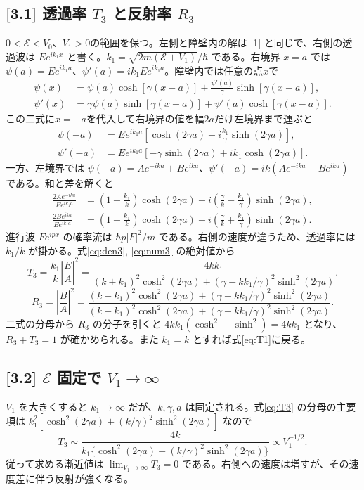 \documentclass[11pt,a4paper]{article}
\begin{document}
\subsection*{[3.1] 透過率 $T_3$ と反射率 $R_3$}
$0<\mathcal E<V_0$、$V_1>0$の範囲を保つ。左側と障壁内の解は [1] と同じで、右側の透過波は $Ee^{ik_1x}$ と書く。$k_1=\sqrt{2m(\mathcal E+V_1)}/\hbar$ である。右境界 $x=a$ では $\psi(a)=Ee^{ik_1a}$、$\psi'(a)=ik_1Ee^{ik_1a}$。障壁内では任意の点$x$で
\begin{align*}
 \psi(x)&=\psi(a)\cosh[\gamma(x-a)]+\frac{\psi'(a)}\gamma\sinh[\gamma(x-a)],\\
 \psi'(x)&=\gamma\psi(a)\sinh[\gamma(x-a)]+\psi'(a)\cosh[\gamma(x-a)].
\end{align*}
この二式に$x=-a$を代入して右境界の値を幅$2a$だけ左境界まで運ぶと
\begin{align*}
 \psi(-a)&=Ee^{ik_1a}\left[\cosh(2\gamma a)-i\frac{k_1}{\gamma}\sinh(2\gamma a)\right],\\
 \psi'(-a)&=Ee^{ik_1a}\left[-\gamma\sinh(2\gamma a)+ik_1\cosh(2\gamma a)\right].
\end{align*}
一方、左境界では $\psi(-a)=Ae^{-ika}+Be^{ika}$、$\psi'(-a)=ik(Ae^{-ika}-Be^{ika})$ である。和と差を解くと
\begin{align}
 \frac{2Ae^{-ika}}{Ee^{ik_1a}}
 &=\left(1+\frac{k_1}{k}\right)\cosh(2\gamma a)
 +i\left(\frac{\gamma}{k}-\frac{k_1}{\gamma}\right)\sinh(2\gamma a),\label{eq:den3}\\
 \frac{2Be^{ika}}{Ee^{ik_1a}}
 &=\left(1-\frac{k_1}{k}\right)\cosh(2\gamma a)
 -i\left(\frac{\gamma}{k}+\frac{k_1}{\gamma}\right)\sinh(2\gamma a).\label{eq:num3}
\end{align}
進行波 $Fe^{ipx}$ の確率流は $\hbar p|F|^2/m$ である。右側の速度が違うため、透過率には $k_1/k$ が掛かる。式\eqref{eq:den3}, \eqref{eq:num3} の絶対値から
\begin{equation}
 \boxed{T_3=\frac{k_1}{k}\left|\frac EA\right|^2
 =\frac{4kk_1}{(k+k_1)^2\cosh^2(2\gamma a)
 +(\gamma-kk_1/\gamma)^2\sinh^2(2\gamma a)}}.\label{eq:T3}
\end{equation}
\begin{equation}
 \boxed{R_3=\left|\frac BA\right|^2
 =\frac{(k-k_1)^2\cosh^2(2\gamma a)
 +(\gamma+kk_1/\gamma)^2\sinh^2(2\gamma a)}
 {(k+k_1)^2\cosh^2(2\gamma a)
 +(\gamma-kk_1/\gamma)^2\sinh^2(2\gamma a)}}.\label{eq:R3}
\end{equation}
二式の分母から $R_3$ の分子を引くと $4kk_1(\cosh^2-\sinh^2)=4kk_1$ となり、$R_3+T_3=1$ が確かめられる。また $k_1=k$ とすれば式\eqref{eq:T1}に戻る。

\subsection*{[3.2] $\mathcal E$ 固定で $V_1\to\infty$}
$V_1$ を大きくすると $k_1\to\infty$ だが、$k,\gamma,a$ は固定される。式\eqref{eq:T3} の分母の主要項は $k_1^2[\cosh^2(2\gamma a)+(k/\gamma)^2\sinh^2(2\gamma a)]$ なので
\[
 T_3\sim\frac{4k}{k_1\{\cosh^2(2\gamma a)+(k/\gamma)^2\sinh^2(2\gamma a)\}}
 \propto V_1^{-1/2}.
\]
従って求める漸近値は $\boxed{\lim_{V_1\to\infty}T_3=0}$ である。右側への速度は増すが、その速度差に伴う反射が強くなる。
\end{document}
